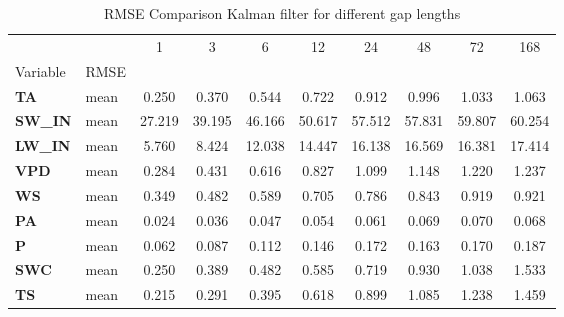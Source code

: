 \begin{table}
\centering
\caption{RMSE Comparison Kalman filter for different gap lengths}
\label{gap_len}
\begin{tabular}{p{2.1cm}l|cccccccc}
\toprule
 &  & 1 & 3 & 6 & 12 & 24 & 48 & 72 & 168 \\
Variable & RMSE &  &  &  &  &  &  &  &  \\
\midrule
\parbox{2.1cm}{\textbf{TA}} & mean & 0.250 & 0.370 & 0.544 & 0.722 & 0.912 & 0.996 & 1.033 & 1.063 \\
\parbox{2.1cm}{\textbf{SW\_IN}} & mean & 27.219 & 39.195 & 46.166 & 50.617 & 57.512 & 57.831 & 59.807 & 60.254 \\
\parbox{2.1cm}{\textbf{LW\_IN}} & mean & 5.760 & 8.424 & 12.038 & 14.447 & 16.138 & 16.569 & 16.381 & 17.414 \\
\parbox{2.1cm}{\textbf{VPD}} & mean & 0.284 & 0.431 & 0.616 & 0.827 & 1.099 & 1.148 & 1.220 & 1.237 \\
\parbox{2.1cm}{\textbf{WS}} & mean & 0.349 & 0.482 & 0.589 & 0.705 & 0.786 & 0.843 & 0.919 & 0.921 \\
\parbox{2.1cm}{\textbf{PA}} & mean & 0.024 & 0.036 & 0.047 & 0.054 & 0.061 & 0.069 & 0.070 & 0.068 \\
\parbox{2.1cm}{\textbf{P}} & mean & 0.062 & 0.087 & 0.112 & 0.146 & 0.172 & 0.163 & 0.170 & 0.187 \\
\parbox{2.1cm}{\textbf{SWC}} & mean & 0.250 & 0.389 & 0.482 & 0.585 & 0.719 & 0.930 & 1.038 & 1.533 \\
\parbox{2.1cm}{\textbf{TS}} & mean & 0.215 & 0.291 & 0.395 & 0.618 & 0.899 & 1.085 & 1.238 & 1.459 \\
\bottomrule
\end{tabular}
\end{table}
